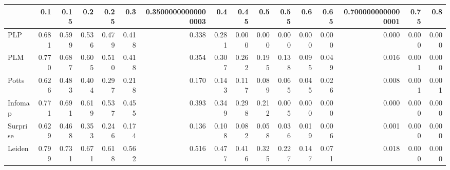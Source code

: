 \begin{tabular}{lrrrrrrrrrrrrrrr}
\toprule
{} &   0.1 &  0.15 &   0.2 &  0.25 &   0.3 & 0.35000000000000003 &   0.4 &  0.45 &   0.5 &  0.55 &   0.6 &  0.65 & 0.7000000000000001 &  0.75 &   0.8 \\
\midrule
PLP      & 0.681 & 0.599 & 0.536 & 0.479 & 0.418 &               0.338 & 0.281 & 0.000 & 0.000 & 0.000 & 0.000 & 0.000 &              0.000 & 0.000 & 0.000 \\
PLM      & 0.770 & 0.687 & 0.605 & 0.510 & 0.418 &               0.354 & 0.307 & 0.262 & 0.195 & 0.138 & 0.095 & 0.049 &              0.016 & 0.001 & 0.000 \\
Potts    & 0.626 & 0.483 & 0.404 & 0.297 & 0.218 &               0.170 & 0.143 & 0.117 & 0.089 & 0.065 & 0.045 & 0.026 &              0.008 & 0.001 & 0.001 \\
Infomap  & 0.771 & 0.691 & 0.619 & 0.537 & 0.455 &               0.393 & 0.349 & 0.298 & 0.212 & 0.005 & 0.000 & 0.000 &              0.000 & 0.000 & 0.000 \\
Surprise & 0.629 & 0.468 & 0.353 & 0.246 & 0.174 &               0.136 & 0.108 & 0.082 & 0.058 & 0.036 & 0.019 & 0.006 &              0.001 & 0.000 & 0.000 \\
Leiden   & 0.799 & 0.731 & 0.671 & 0.618 & 0.562 &               0.516 & 0.477 & 0.416 & 0.325 & 0.227 & 0.147 & 0.071 &              0.018 & 0.000 & 0.000 \\
\bottomrule
\end{tabular}
